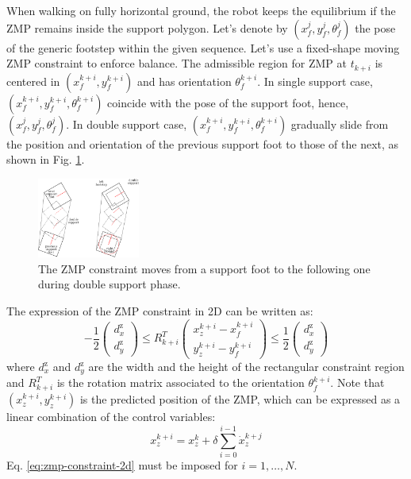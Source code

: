 When walking on fully horizontal ground, the robot keeps the equilibrium 
if the ZMP remains inside the support polygon. Let's denote by
$(x_f^j, y_f^j, \theta_f^j)$ the pose of the 
generic footstep within the given sequence.
Let's use a fixed-shape moving ZMP constraint \cite{aboudonia17} to
enforce balance. The admissible region for ZMP at $t_{k+i}$ is centered in 
$(x_f^{k+i}, y_f^{k+i})$ and has orientation $\theta_f^{k+i}$.
In single support case, $(x_f^{k+i}, y_f^{k+i}, \theta_f^{k+i})$ coincide with
the pose of the support foot, hence, $(x_f^j, y_f^j, \theta_f^j)$.
In double support case, $(x_f^{k+i}, y_f^{k+i}, \theta_f^{k+i})$ gradually
slide from the position 
and orientation of the previous support foot to those of the next, as shown 
in Fig. \ref{fig:double-support}. 
\begin{figure}
    \centering
    \includegraphics[width=0.3\textwidth]{figures/double_support.pdf}
    \caption{The ZMP constraint moves from a support foot to the following 
        one during double support phase.}
    \label{fig:double-support}
\end{figure}
The expression of the ZMP constraint in 2D can be written as:
\begin{equation}
  \label{eq:zmp-constraint-2d}
  -\frac{1}{2}
  \begin{pmatrix}
    d_x^\text{z} \\
    d_y^\text{z}
  \end{pmatrix}
  \le
  R_{k+i}^T
  \begin{pmatrix}
    x_z^{k+i} - x_f^{k+i} \\
    y_z^{k+i} - y_f^{k+i}
  \end{pmatrix}
  \le
  \frac{1}{2}
  \begin{pmatrix}
    d_x^\text{z} \\
    d_y^\text{z}
  \end{pmatrix}
\end{equation}
where $d_x^\text{z}$ and $d_y^\text{z}$ are the width and the height of the
rectangular constraint region and $R_{k+i}^T$ is the rotation matrix associated
to the orientation $\theta_f^{k+i}$.
Note that $(x_z^{k+i}, y_z^{k+i})$ is the predicted position
of the ZMP, which can be expressed as a linear combination of the control
variables:
\begin{equation}
  \label{eq:piecewise-linear-zmp-trajectory}
  x_z^{k+i} = x_z^k + \delta \sum_{i=0}^{i-1} \dot{x}_z^{k+j}
\end{equation}
Eq. \eqref{eq:zmp-constraint-2d} must be imposed for $i = 1, \dots, N$.

